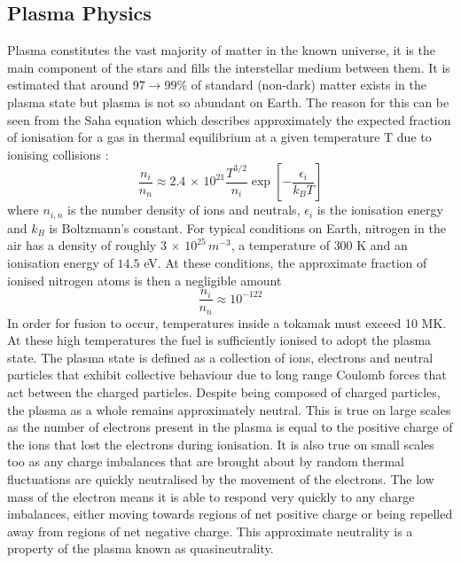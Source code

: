 \subsection{Plasma Physics} 
Plasma constitutes the vast majority of matter in the known universe, it is the main component of the stars and fills the interstellar medium between them. It is estimated that around $97 \to 99  \% $ of standard (non-dark) matter exists in the plasma state \cite{chen2015introduction} but plasma is not so abundant on Earth. The reason for this can be seen from the Saha equation which describes approximately the expected fraction of ionisation for a gas in thermal equilibrium at a given temperature T due to ionising collisions \cite{chen2015introduction}: 
\begin{equation}
\frac{n_i}{n_n} \approx 2.4 \, \times \, 10^{21} \frac{T^{3/2}}{n_i} \exp \left[-\frac{\epsilon_i}{k_B T}\right]
\end{equation}
where $n_{i,n}$ is the number density of ions and neutrals, $\epsilon_i$ is the ionisation energy and $k_B$ is Boltzmann's constant. For typical conditions on Earth, nitrogen in the air has a density of roughly $3 \, \times \, 10^{25}\, m^{-3}$, a temperature of $300$ K and an ionisation energy of $14.5$ eV. At these conditions, the approximate fraction of ionised nitrogen atoms is then a negligible amount
\begin{equation}
\frac{n_i}{n_n} \approx 10^{-122}
\end{equation}
In order for fusion to occur, temperatures inside a tokamak must exceed 10 MK. At these high temperatures the fuel is sufficiently ionised to adopt the plasma state. 
The plasma state is defined as a collection of ions, electrons and neutral particles that exhibit collective behaviour due to long range Coulomb forces that act between the charged particles. Despite being composed of charged particles, the plasma as a whole remains approximately neutral. This is true on large scales as the number of electrons present in the plasma is equal to the positive charge of the ions that lost the electrons during ionisation. It is also true on small scales too as any charge imbalances that are brought about by random thermal fluctuations are quickly neutralised by the movement of the electrons. The low mass of the electron means it is able to respond very quickly to any charge imbalances, either moving towards regions of net positive charge or being repelled away from regions of net negative charge. This approximate neutrality is a property of the plasma known as quasineutrality. 


